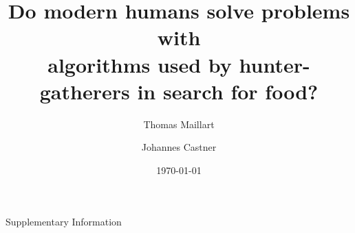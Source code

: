 \documentclass[12pt]{revtex4}
\begin{document}
\title{Do modern humans solve problems with \\ algorithms used by hunter-gatherers in search for food?}

\author{Thomas Maillart}

\author{Johannes Castner}




\date{\today}


\begin{abstract}

\end{abstract}

\maketitle


%




%

\clearpage





\clearpage


\clearpage
%

\renewcommand\thesection{S\arabic{section}}
\setcounter{section}{0}

\renewcommand\theequation{S\arabic{equation}}
\setcounter{equation}{0}


\begin{center}
{\Large Supplementary Information}
\vspace{3cm}
\end{center}





\end{document}
